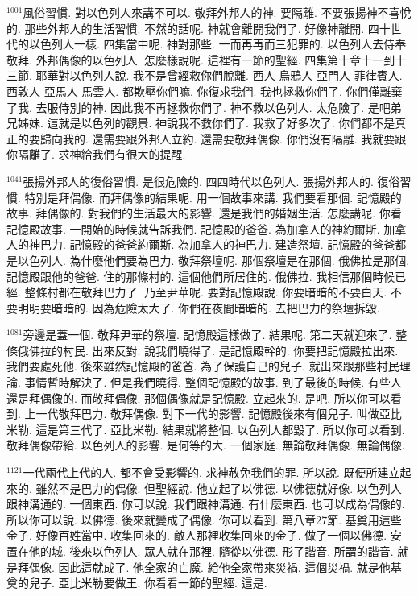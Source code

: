 \documentclass{book}
\begin{document}
$^{1001}$風俗習慣.
對以色列人來講不可以.
敬拜外邦人的神.
要隔離.
不要張揚神不喜悅的.
那些外邦人的生活習慣.
不然的話呢.
神就會離開我們了.
好像神離開.
四十世代的以色列人一樣.
四集當中呢.
神對那些.
一而再再而三犯罪的.
以色列人去侍奉敬拜.
外邦偶像的以色列人.
怎麼樣說呢.
這裡有一節的聖經.
四集第十章十一到十三節.
耶華對以色列人說.
我不是曾經救你們脫離.
西人 烏鴉人 亞門人 菲律賓人.
西敦人 亞馬人 馬雲人.
都欺壓你們嘛.
你復求我們.
我也拯救你們了.
你們僅離棄了我.
去服侍別的神.
因此我不再拯救你們了.
神不救以色列人.
太危險了.
是吧弟兄姊妹.
這就是以色列的觀景.
神說我不救你們了.
我救了好多次了.
你們都不是真正的要歸向我的.
還需要跟外邦人立約.
還需要敬拜偶像.
你們沒有隔離.
我就要跟你隔離了.
求神給我們有很大的提醒.

$^{1041}$張揚外邦人的復俗習慣.
是很危險的.
四四時代以色列人.
張揚外邦人的.
復俗習慣.
特別是拜偶像.
而拜偶像的結果呢.
用一個故事來講.
我們要看那個.
記憶殿的故事.
拜偶像的.
對我們的生活最大的影響.
還是我們的婚姻生活.
怎麼講呢.
你看記憶殿故事.
一開始的時候就告訴我們.
記憶殿的爸爸.
為加拿人的神約爾斯.
加拿人的神巴力.
記憶殿的爸爸約爾斯.
為加拿人的神巴力.
建造祭壇.
記憶殿的爸爸都是以色列人.
為什麼他們要為巴力.
敬拜祭壇呢.
那個祭壇是在那個.
俄佛拉是那個.
記憶殿跟他的爸爸.
住的那條村的.
這個他們所居住的.
俄佛拉.
我相信那個時候已經.
整條村都在敬拜巴力了.
乃至尹華呢.
要對記憶殿說.
你要暗暗的不要白天.
不要明明要暗暗的.
因為危險太大了.
你們在夜間暗暗的.
去把巴力的祭壇拆毀.

$^{1081}$旁邊是蓋一個.
敬拜尹華的祭壇.
記憶殿這樣做了.
結果呢.
第二天就迎來了.
整條俄佛拉的村民.
出來反對.
說我們曉得了.
是記憶殿幹的.
你要把記憶殿拉出來.
我們要處死他.
後來雖然記憶殿的爸爸.
為了保護自己的兒子.
就出來跟那些村民理論.
事情暫時解決了.
但是我們曉得.
整個記憶殿的故事.
到了最後的時候.
有些人還是拜偶像的.
而敬拜偶像.
那個偶像就是記憶殿.
立起來的.
是吧.
所以你可以看到.
上一代敬拜巴力.
敬拜偶像.
對下一代的影響.
記憶殿後來有個兒子.
叫做亞比米勒.
這是第三代了.
亞比米勒.
結果就將整個.
以色列人都毀了.
所以你可以看到.
敬拜偶像帶給.
以色列人的影響.
是何等的大.
一個家庭.
無論敬拜偶像.
無論偶像.

$^{1121}$一代兩代上代的人.
都不會受影響的.
求神赦免我們的罪.
所以說.
既便所建立起來的.
雖然不是巴力的偶像.
但聖經說.
他立起了以佛德.
以佛德就好像.
以色列人跟神溝通的.
一個東西.
你可以說.
我們跟神溝通.
有什麼東西.
也可以成為偶像的.
所以你可以說.
以佛德.
後來就變成了偶像.
你可以看到.
第八章27節.
基奠用這些金子.
好像百姓當中.
收集回來的.
敵人那裡收集回來的金子.
做了一個以佛德.
安置在他的城.
後來以色列人.
眾人就在那裡.
隨從以佛德.
形了諧音.
所謂的諧音.
就是拜偶像.
因此這就成了.
他全家的亡魔.
給他全家帶來災禍.
這個災禍.
就是他基奠的兒子.
亞比米勒要做王.
你看看一節的聖經.
這是.
\end{document}
